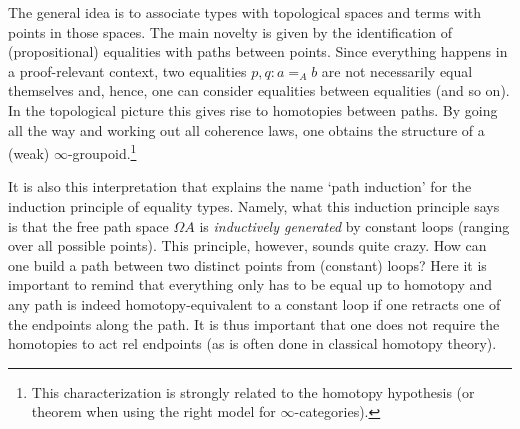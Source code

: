     The general idea is to associate types with topological spaces and terms with points in those spaces. The main novelty is given by the identification of (propositional) equalities with paths between points. Since everything happens in a proof-relevant context, two equalities $p,q:a=_Ab$ are not necessarily equal themselves and, hence, one can consider equalities between equalities (and so on). In the topological picture this gives rise to homotopies between paths. By going all the way and working out all coherence laws, one obtains the structure of a (weak) $\infty$-groupoid.\footnote{This characterization is strongly related to the homotopy hypothesis (or theorem when using the right model for $\infty$-categories).}

    It is also this interpretation that explains the name `path induction' for the induction principle of equality types. Namely, what this induction principle says is that the free path space $\Omega A$ is \textit{inductively generated} by constant loops (ranging over all possible points). This principle, however, sounds quite crazy. How can one build a path between two distinct points from (constant) loops? Here it is important to remind that everything only has to be equal up to homotopy and any path is indeed homotopy-equivalent to a constant loop if one retracts one of the endpoints along the path. It is thus important that one does not require the homotopies to act rel endpoints (as is often done in classical homotopy theory).


